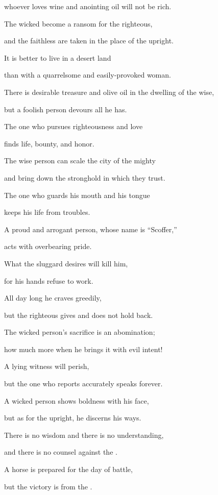 {\par }{\Q whoever
loves
wine
and anointing oil
will not
be rich.
\par }{\Q {}The wicked
become a ransom
for the righteous,
\par }{\Q and the faithless
are taken in the place
of the upright.
\par }{\Q {}It is better
to live
in a desert
land
\par }{\Q than with a quarrelsome
and easily-provoked
woman.
\par }{\Q {}There is desirable
treasure
and olive oil
in the dwelling
of the wise,
\par }{\Q but a foolish
person
devours all he has.
\par }{\Q {}The one who pursues
righteousness
and love
\par }{\Q finds
life,
bounty, and honor.
\par }{\Q {}The wise
person can scale
the city
of the mighty
\par }{\Q and bring down
the stronghold
in which they trust.
\par }{\Q {}The one who guards
his mouth
and his tongue
\par }{\Q keeps
his life
from troubles.
\par }{\Q {}A proud
and arrogant
person, whose name
is “Scoffer,”
\par }{\Q acts
with overbearing
pride.
\par }{\Q {}What the sluggard
desires
will kill
him,

\par }{\Q for
his hands
refuse to work.
\par }{\Q {}All
day
long he craves
greedily,
\par }{\Q but the righteous
gives
and does not
hold back.
\par }{\Q {}The wicked
person’s sacrifice
is an abomination;
\par }{\Q how much
more when
he brings
it with evil intent!
\par }{\Q {}A lying
witness
will perish,
\par }{\Q but the one
who reports accurately
speaks
forever.
\par }{\Q {}A wicked
person
shows boldness
with his face,
\par }{\Q but
as for the upright,
he
discerns
his ways.
\par }{\Q {}There is no
wisdom
and there is no
understanding,
\par }{\Q and there is no
counsel
against
the
{}.
\par }{\Q {}A horse
is prepared
for the day
of battle,
\par }{\Q but the victory
is from the
{}.

}

